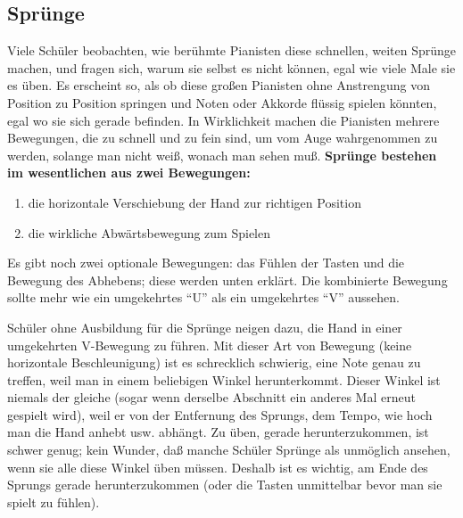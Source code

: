 
\subsection{Sprünge}\hypertarget{c1iii7f}{}

Viele Schüler beobachten, wie berühmte Pianisten diese schnellen, weiten Sprünge machen, und fragen sich, warum sie selbst es nicht können, egal wie viele Male sie es üben.
Es erscheint so, als ob diese großen Pianisten ohne Anstrengung von Position zu Position springen und Noten oder Akkorde flüssig spielen könnten, egal wo sie sich gerade befinden.
In Wirklichkeit machen die Pianisten mehrere Bewegungen, die zu schnell und zu fein sind, um vom Auge wahrgenommen zu werden, solange man nicht weiß, wonach man sehen muß.
\textbf{Sprünge bestehen im wesentlichen aus zwei Bewegungen:}

\begin{enumerate}[label={\arabic*.}] 
 \item die horizontale Verschiebung der Hand zur richtigen Position
 \item die wirkliche Abwärtsbewegung zum Spielen
 \end{enumerate}
Es gibt noch zwei optionale Bewegungen: das Fühlen der Tasten und die Bewegung des Abhebens; diese werden unten erklärt.
Die kombinierte Bewegung sollte mehr wie ein umgekehrtes \enquote{U} als ein umgekehrtes \enquote{V} aussehen.

Schüler ohne Ausbildung für die Sprünge neigen dazu, die Hand in einer umgekehrten V-Bewegung zu führen.
Mit dieser Art von Bewegung (keine horizontale Beschleunigung) ist es schrecklich schwierig, eine Note genau zu treffen, weil man in einem beliebigen Winkel herunterkommt.
Dieser Winkel ist niemals der gleiche (sogar wenn derselbe Abschnitt ein anderes Mal erneut gespielt wird), weil er von der Entfernung des Sprungs, dem Tempo, wie hoch man die Hand anhebt usw. abhängt.
Zu üben, gerade herunterzukommen, ist schwer genug; kein Wunder, daß manche Schüler Sprünge als unmöglich ansehen, wenn sie alle diese Winkel üben müssen.
Deshalb ist es wichtig, am Ende des Sprungs gerade herunterzukommen (oder die Tasten unmittelbar bevor man sie spielt zu fühlen).

